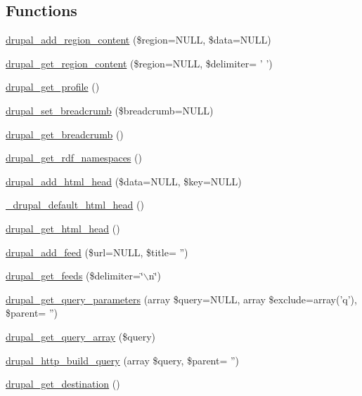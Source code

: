 \subsection*{Functions}
\begin{DoxyCompactItemize}
\item 
\hyperlink{common_8inc_a868829276154d107ebf8a692a6ff7efa}{drupal\_\-add\_\-region\_\-content} (\$region=NULL, \$data=NULL)
\item 
\hyperlink{common_8inc_a3e5f6ebc1abb928bf1634b6813f46dca}{drupal\_\-get\_\-region\_\-content} (\$region=NULL, \$delimiter= ' ')
\item 
\hyperlink{common_8inc_a4128f0023ccec2d1a9a40987f0131d83}{drupal\_\-get\_\-profile} ()
\item 
\hyperlink{common_8inc_a666113d06fa6ea461aff580e5c511eb0}{drupal\_\-set\_\-breadcrumb} (\$breadcrumb=NULL)
\item 
\hyperlink{common_8inc_af1e9626192d1d2e5e63b370e88c03c7c}{drupal\_\-get\_\-breadcrumb} ()
\item 
\hyperlink{common_8inc_aa9c5659618a108b2b031a4fd3438a420}{drupal\_\-get\_\-rdf\_\-namespaces} ()
\item 
\hyperlink{common_8inc_a39eab16a83904b845fccc922a0c5c2cf}{drupal\_\-add\_\-html\_\-head} (\$data=NULL, \$key=NULL)
\item 
\hyperlink{common_8inc_a140ce21f40afe048c44f2726045d9692}{\_\-drupal\_\-default\_\-html\_\-head} ()
\item 
\hyperlink{common_8inc_acdee011d76859a5a9280209df1175188}{drupal\_\-get\_\-html\_\-head} ()
\item 
\hyperlink{common_8inc_a42e1c8001e2609cb73a2f54f59e1020c}{drupal\_\-add\_\-feed} (\$url=NULL, \$title= '')
\item 
\hyperlink{common_8inc_ac7df9703641369003434d49cf917c16e}{drupal\_\-get\_\-feeds} (\$delimiter=\char`\"{}$\backslash$n\char`\"{})
\item 
\hyperlink{group__http__handling_ga2e632373cf469e513c0b6b7095f0e4dd}{drupal\_\-get\_\-query\_\-parameters} (array \$query=NULL, array \$exclude=array('q'), \$parent= '')
\item 
\hyperlink{group__http__handling_ga0ef58c019ee4bf4e1166e876f9721c12}{drupal\_\-get\_\-query\_\-array} (\$query)
\item 
\hyperlink{group__php__wrappers_gada763092b76d70856870eb3afa2ad265}{drupal\_\-http\_\-build\_\-query} (array \$query, \$parent= '')
\item 
\hyperlink{group__http__handling_ga0c95c16e75ac4df882686daccc1f8ac5}{drupal\_\-get\_\-destination} ()

\end{DoxyCompactItemize}
